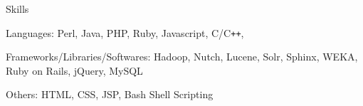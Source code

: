 \documentclass{resume}
\begin{document}
\begin{category}{Skills}{}

    \item {\topic Languages:} Perl, Java, PHP, Ruby, Javascript, C/C{\tt ++},

    \item {\topic Frameworks/Libraries/Softwares:} Hadoop, Nutch, Lucene, Solr,
        Sphinx, WEKA, Ruby on Rails, jQuery, MySQL

    \item {\topic Others:} HTML, CSS, JSP, Bash Shell Scripting

\end{category}


\end{document}
